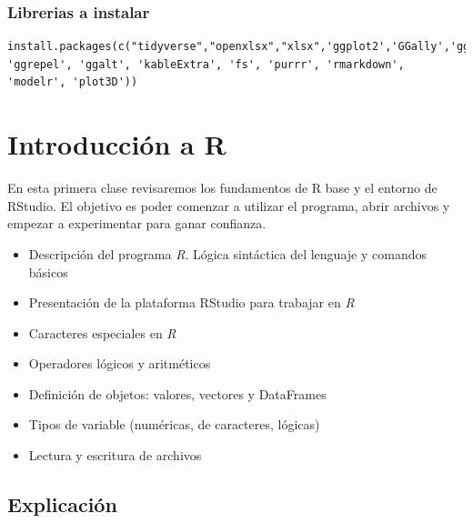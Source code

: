 \documentclass[]{book}
\providecommand{\tightlist}{%
  \setlength{\itemsep}{0pt}\setlength{\parskip}{0pt}}
\begin{document}
\hypertarget{librerias-a-instalar}{%
\subsection{Librerias a instalar}\label{librerias-a-instalar}}

\begin{verbatim}
install.packages(c("tidyverse","openxlsx","xlsx",'ggplot2','GGally','ggridges','treemapify','esquisse','cowplot','ggthemes', 'ggrepel', 'ggalt', 'kableExtra', 'fs', 'purrr', 'rmarkdown', 'modelr', 'plot3D'))
\end{verbatim}

\hypertarget{introduccion-a-r}{%
\chapter{Introducción a R}\label{introduccion-a-r}}

En esta primera clase revisaremos los fundamentos de R base y el entorno de RStudio. El objetivo es poder comenzar a utilizar el programa, abrir archivos y empezar a experimentar para ganar confianza.

\begin{itemize}
\tightlist
\item
  Descripción del programa \emph{R}. Lógica sintáctica del lenguaje y comandos básicos
\item
  Presentación de la plataforma RStudio para trabajar en \emph{R}
\item
  Caracteres especiales en \emph{R}
\item
  Operadores lógicos y aritméticos
\item
  Definición de objetos: valores, vectores y DataFrames
\item
  Tipos de variable (numéricas, de caracteres, lógicas)
\item
  Lectura y escritura de archivos
\end{itemize}

\hypertarget{explicacion}{%
\section{Explicación}\label{explicacion}}
\end{document}

